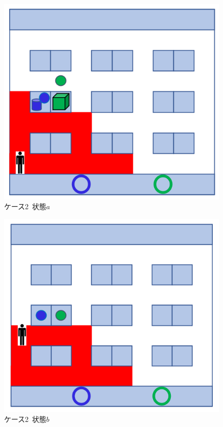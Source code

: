 \begin{figure}[!t]
    \centering
    \includegraphics[scale=0.35]{figures/HITL1_case2_a.png}
    \caption{ケース2\ 状態$a$}
    \label{fig:HITL1_case2_a}
\end{figure}

\begin{figure}[!t]
    \centering
    \includegraphics[scale=0.35]{figures/HITL1_case2_b.png}
    \caption{ケース2\ 状態$b$}
    \label{fig:HITL1_case2_b}
\end{figure}

